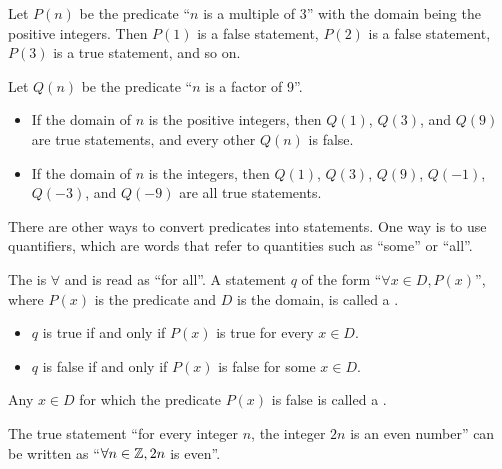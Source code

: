 \begin{example}
    Let $P(n)$ be the predicate ``$n$ is a multiple of 3'' with the domain being the positive integers. Then $P(1)$ is a false statement, $P(2)$ is a false statement, $P(3)$ is a true statement, and so on.
\end{example}

\begin{example}
    Let $Q(n)$ be the predicate ``$n$ is a factor of 9''.
    \begin{itemize}
        \item If the domain of $n$ is the positive integers, then $Q(1)$, $Q(3)$, and $Q(9)$ are true statements, and every other $Q(n)$ is false.
        \item If the domain of $n$ is the integers, then $Q(1)$, $Q(3)$, $Q(9)$, $Q(-1)$, $Q(-3)$, and $Q(-9)$ are all true statements.
    \end{itemize}
\end{example}

There are other ways to convert predicates into statements. One way is to use quantifiers, which are words that refer to quantities such as ``some'' or ``all''.

\begin{definition}
    The  is $\forall$ and is read as ``for all''. A statement $q$ of the form ``$\forall x \in D, P(x)$'', where $P(x)$ is the predicate and $D$ is the domain, is called a .
    \begin{itemize}
        \item $q$ is true if and only if $P(x)$ is true for every $x \in D$.
        \item $q$ is false if and only if $P(x)$ is false for some $x \in D$.
    \end{itemize}
\end{definition}

\begin{remark}
    Any $x \in D$ for which the predicate $P(x)$ is false is called a .
\end{remark}

\begin{example}
    The true statement ``for every integer $n$, the integer $2n$ is an even number'' can be written as ``$\forall n \in \mathbb{Z}, 2n$ is even''.
\end{example}

